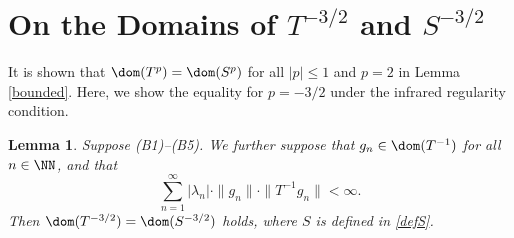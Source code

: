 \documentclass[12pt,draft]{article}
\theoremstyle{plain}
\newtheorem{lem}[theorem]{\bf Lemma}
\numberwithin{equation}{section}
\theoremstyle{remark}
\begin{document}
\section{On the Domains of $T^{-3/2}$ and $S^{-3/2}$}

It is shown that $\dom(T^{p})=\dom(S^{p})$ for all $|p|\leq 1$ and $p=2$ in Lemma \ref{bounded}.
Here, we show the equality for $p=-3/2$ under the infrared regularity condition.

\begin{lem}\label{domain-3/2}
Suppose (B1)--(B5).
We further suppose that $g_n\in\dom(T^{-1})$ for all $n\in\NN$, and that
\[
\sum_{n=1}^{\infty}|\lambda_n|\cdot\|g_n\|\cdot\|T^{-1}g_n\|<\infty.
\]
Then $\dom(T^{-3/2})=\dom(S^{-3/2})$ holds, where $S$ is defined in \eqref{defS}.
\end{lem}
\end{document}
